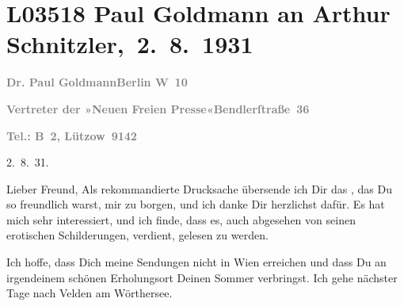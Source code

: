 

\section[ Paul Goldmann an Arthur Schnitzler, 2. 8. 1931]{L03518 Paul Goldmann an Arthur Schnitzler, 2. 8. 1931}
\nopagebreak{}
\rehead{ }\normalsize\beginnumbering{}
\toendnotes[C]{\smallbreak\pagebreak[2]}
\toendnotes[C]{\smallbreak}
\pstart
           {\pb}\textcolor{gray}{\textbf{Dr. Paul Goldmann}}\hfill \textcolor{gray}{\textbf{Berlin W 10}}\pend
           
\pstart
           \textcolor{gray}{\textbf{Vertreter der »Neuen Freien
                           Presse«}}\hfill \textcolor{gray}{\textbf{Bendlerſtraße 36}}\pend
           
\pstart
           \raggedleft{}\textcolor{gray}{\textbf{Tel.: B 2, Lützow 9142}}\pend
           
\pstart
           \raggedleft{}2. 8. 31.\pend
           
\pstart\center{}Lieber Freund,\pend\vspace{0.5em}
\pstart
           Als rekommandierte Drucksache übersende ich Dir das \label{K_L03518-1v}\label{K_L03518-1}, das Du so freundlich warst, mir zu borgen, und ich danke Dir herzlich\introOben{}st\introOben{} dafür. Es hat mich sehr interessiert, und ich finde, dass
               es, auch abgesehen von seinen erotischen Schilderungen, verdient, gelesen zu
               werden.\pend
           
\pstart
           Ich hoffe, dass Dich meine Sendungen nicht in Wien
               erreichen und dass Du an irgendeinem schönen Erholungsort Deinen Sommer verbringst.
               Ich gehe nächster Tage nach Velden am
               Wörthersee.\pend
           
